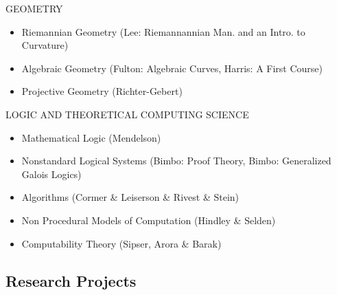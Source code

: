 \documentclass{friggeri-cv}
\begin{document}
\begin{entrylist}

\entries
{GEOMETRY}
{
\begin{itemize}
    \setlength\itemsep{-1em}
    \item Riemannian Geometry (Lee: Riemannannian Man. and an Intro. to Curvature)\\
    \item Algebraic Geometry (Fulton: Algebraic Curves, Harris: A First Course)\\
    \item Projective Geometry (Richter-Gebert)
\end{itemize}
}


\entries
{LOGIC AND THEORETICAL COMPUTING SCIENCE}
{
\begin{itemize}
    \setlength\itemsep{-1em}
    \item Mathematical Logic (Mendelson)\\
    \item Nonstandard Logical Systems (Bimbo: Proof Theory, Bimbo: Generalized Galois Logics)\\
    \item Algorithms (Cormer \& Leiserson \& Rivest \& Stein)\\
    \item Non Procedural Models of Computation (Hindley \& Selden)\\
    \item Computability Theory (Sipser, Arora \& Barak)
\end{itemize}
}


\end{entrylist}

\pagebreak[4]
\subsection{Research Projects}
\end{document}
